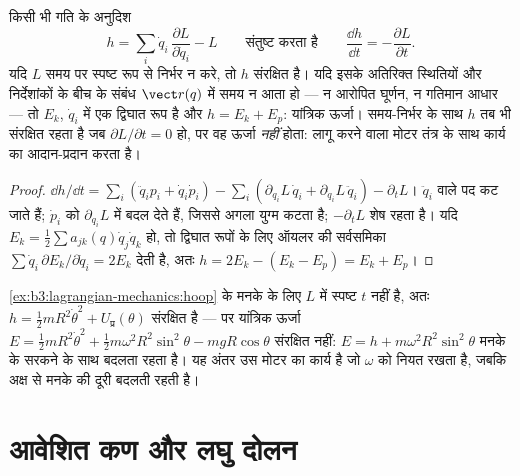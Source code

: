 \begin{proposition}[ऊर्जा फलन]\label{prop:b3:lagrangian-mechanics:energy}
किसी भी गति के अनुदिश \emph{}
\[
h = \sum_i \dot q_i\,\frac{\partial L}{\partial\dot q_i} - L
\qquad\text{संतुष्ट करता है}\qquad
\frac{\dd h}{\dd t} = -\frac{\partial L}{\partial t} .
\]
यदि $L$ समय पर स्पष्ट रूप से निर्भर न करे, तो $h$ संरक्षित है। यदि
इसके अतिरिक्त स्थितियों और निर्देशांकों के बीच के संबंध $\vect r(q)$ में
समय न आता हो --- न आरोपित घूर्णन, न गतिमान आधार --- तो
$E_k$, $\dot q_i$ में एक द्विघात रूप है और $h = E_k + E_p$: यांत्रिक
ऊर्जा। समय-निर्भर  के साथ $h$ तब भी संरक्षित रहता है जब
$\partial L/\partial t = 0$ हो, पर वह ऊर्जा \emph{नहीं} होता:
 लागू करने वाला मोटर तंत्र के साथ कार्य का आदान-प्रदान करता है।
\end{proposition}

\begin{proof}
$\dd h/\dd t = \sum_i(\ddot q_ip_i + \dot q_i\dot p_i) -
\sum_i(\partial_{q_i}L\,\dot q_i + \partial_{\dot q_i}L\,\ddot q_i) -
\partial_tL$। $\ddot q_i$ वाले पद कट जाते हैं;  $\dot p_i$ को $\partial_{q_i}L$ में बदल देते हैं, जिससे अगला
युग्म कटता है; $-\partial_tL$ शेष रहता है। यदि $E_k = \tfrac12\sum a_{jk}(q)\dot
q_j\dot q_k$ हो, तो द्विघात रूपों के लिए ऑयलर की सर्वसमिका $\sum\dot
q_i\,\partial E_k/\partial\dot q_i = 2E_k$ देती है, अतः $h = 2E_k - (E_k - E_p)
= E_k + E_p$।
\end{proof}

\begin{example}\label{ex:b3:lagrangian-mechanics:hoop-energy}
\cref{ex:b3:lagrangian-mechanics:hoop} के मनके के लिए $L$ में स्पष्ट
$t$ नहीं है, अतः $h = \tfrac12 mR^2\dot\theta^2 + U_{\text{प्र}}
(\theta)$ संरक्षित है --- पर यांत्रिक ऊर्जा $E = \tfrac12
mR^2\dot\theta^2 + \tfrac12 m\omega^2R^2\sin^2\theta - mgR\cos\theta$
संरक्षित नहीं: $E = h + m\omega^2R^2\sin^2\theta$ मनके के सरकने के साथ
बदलता रहता है। यह अंतर उस मोटर का कार्य है जो $\omega$ को नियत रखता है,
जबकि अक्ष से मनके की दूरी बदलती रहती है।
\end{example}

\section{आवेशित कण और लघु दोलन}

